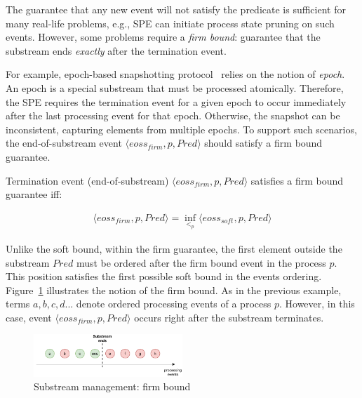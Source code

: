 The guarantee that any new event will not satisfy the predicate is sufficient for many real-life problems, e.g., SPE can initiate process state pruning on such events. However, some problems require a {\em firm bound}: guarantee that the substream ends {\em exactly} after the termination event. 

For example, epoch-based snapshotting protocol~\cite{2015arXiv150608603C, jacques2016consistent} relies on the notion of {\em epoch}. An epoch is a special substream that must be processed atomically. Therefore, the SPE requires the termination event for a given epoch to occur immediately after the last processing event for that epoch. Otherwise, the snapshot can be inconsistent, capturing elements from multiple epochs. To support such scenarios, the end-of-substream event $\langle eoss_{firm}, p, Pred\rangle$ should satisfy a firm bound guarantee.

\begin{definition}
Termination event (end-of-substream) $\langle eoss_{firm}, p, Pred\rangle$ satisfies a firm bound guarantee iff:

\begin{equation}\begin{array}{l}
\langle eoss_{firm}, p, Pred\rangle = \inf_{<_p} \langle eoss_{soft}, p, Pred\rangle
\end{array}\end{equation}
\end{definition}

Unlike the soft bound, within the firm guarantee, the first element outside the substream $Pred$ must be ordered after the firm bound event in the process $p$. This position satisfies the first possible soft bound in the events ordering. Figure~\ref{strict_guarantees} illustrates the notion of the firm bound. As in the previous example, terms $a,b,c,d...$ denote ordered processing events of a process $p$. However, in this case, event $\langle eoss_{firm}, p, Pred\rangle$ occurs right after the substream terminates.

\begin{figure}[t]
  \centering
  \includegraphics[width=0.50\textwidth]{pics/strict-guarantee.pdf}
  \caption{Substream management: firm bound}
  \label{strict_guarantees}
\end{figure}

